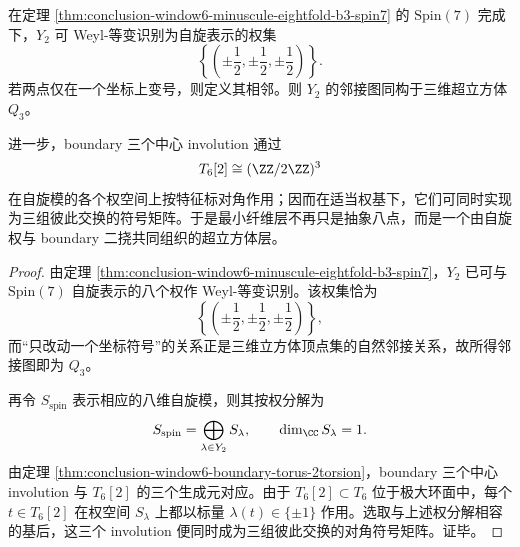 \begin{theorem}\label{thm:conclusion-window6-minimal-fiber-spin-hypercube}
在定理 \ref{thm:conclusion-window6-minuscule-eightfold-b3-spin7} 的 \(\mathrm{Spin}(7)\) 完成下，\(Y_2\) 可 Weyl-等变识别为自旋表示的权集
\[
\left\{
\left(\pm\frac12,\pm\frac12,\pm\frac12\right)
\right\}.
\]
若两点仅在一个坐标上变号，则定义其相邻。则 \(Y_2\) 的邻接图同构于三维超立方体 \(Q_3\)。

进一步，boundary 三个中心 involution 通过
\[
T_6[2]\cong (\ZZ/2\ZZ)^3
\]
在自旋模的各个权空间上按特征标对角作用；因而在适当权基下，它们可同时实现为三组彼此交换的符号矩阵。于是最小纤维层不再只是抽象八点，而是一个由自旋权与 boundary 二挠共同组织的超立方体层。
\end{theorem}
\begin{proof}
由定理 \ref{thm:conclusion-window6-minuscule-eightfold-b3-spin7}，\(Y_2\) 已可与 \(\mathrm{Spin}(7)\) 自旋表示的八个权作 Weyl-等变识别。该权集恰为
\[
\left\{
\left(\pm\frac12,\pm\frac12,\pm\frac12\right)
\right\},
\]
而“只改动一个坐标符号”的关系正是三维立方体顶点集的自然邻接关系，故所得邻接图即为 \(Q_3\)。

再令 \(S_{\mathrm{spin}}\) 表示相应的八维自旋模，则其按权分解为
\[
S_{\mathrm{spin}}
=
\bigoplus_{\lambda\in Y_2} S_\lambda,
\qquad
\dim_\CC S_\lambda=1.
\]
由定理 \ref{thm:conclusion-window6-boundary-torus-2torsion}，boundary 三个中心 involution 与 \(T_6[2]\) 的三个生成元对应。由于 \(T_6[2]\subset T_6\) 位于极大环面中，每个 \(t\in T_6[2]\) 在权空间 \(S_\lambda\) 上都以标量 \(\lambda(t)\in\{\pm1\}\) 作用。选取与上述权分解相容的基后，这三个 involution 便同时成为三组彼此交换的对角符号矩阵。证毕。
\end{proof}

